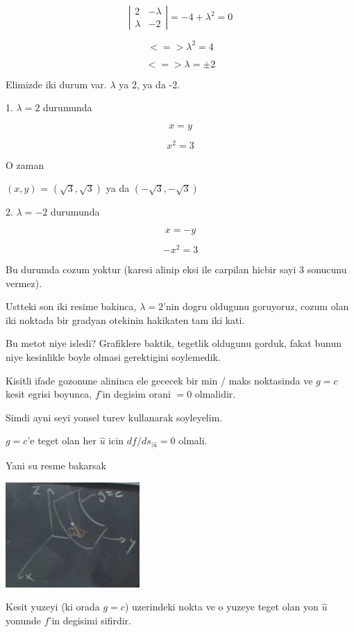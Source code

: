 \documentclass[12pt,fleqn]{article}
\begin{document}
\[ 
\left|\begin{array}{rr}
2 & -\lambda \\
\lambda & -2
\end{array}\right| = -4 + \lambda^2 = 0
 \]

\[ <=> \lambda^2 = 4 \]

\[ <=> \lambda = \pm 2 \]

Elimizde iki durum var. $\lambda$ ya 2, ya da -2. 

1. $\lambda = 2$ durumunda

\[ x = y \]

\[ x^2 = 3 \]

O zaman

$(x,y)$ = $(\sqrt{3}, \sqrt{3})$ ya da $(-\sqrt{3}, -\sqrt{3})$ 

2. $\lambda = -2$ durumunda

\[ x = -y \]

\[ -x^2 = 3 \]

Bu durumda cozum yoktur (karesi alinip eksi ile carpilan hicbir sayi 3
sonucunu vermez). 

Ustteki son iki resime bakinca, $\lambda = 2$'nin dogru oldugunu goruyoruz,
cozum olan iki noktada bir gradyan otekinin hakikaten tam iki kati. 

Bu metot niye isledi? Grafiklere baktik, tegetlik oldugunu gorduk, fakat
bunun niye kesinlikle boyle olmasi gerektigini soylemedik. 

Kisitli ifade gozonune alininca ele gececek bir min / maks noktasinda ve
$g = c$ kesit egrisi boyunca, $f$'in degisim orani $=0$ olmalidir.

Simdi ayni seyi yonsel turev kullanarak soyleyelim. 

$g=c$'e teget olan her $\hat{u}$ icin $df / ds_{|\hat{u}} = 0$ olmali. 

Yani su resme bakarsak

\includegraphics[height=4cm]{13_7.png}

Kesit yuzeyi (ki orada $g=c$) uzerindeki nokta ve o yuzeye teget olan yon
$\hat{u}$ yonunde $f$'in degisimi sifirdir. 
\end{document}
